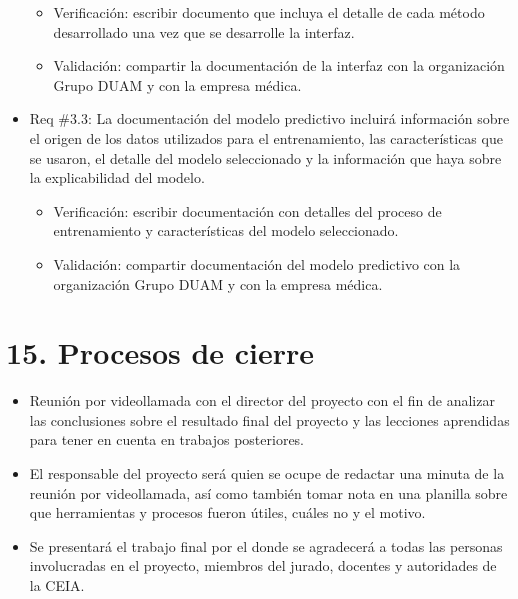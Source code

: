 \documentclass[
11pt, %
]{charter}
\begin{document}
\begin{itemize}
\begin{itemize}
		\item Verificación: escribir documento que incluya el detalle de cada método desarrollado una vez que se desarrolle la interfaz.
		\item Validación: compartir la documentación de la interfaz con la organización Grupo DUAM y con la empresa médica.
	\end{itemize}
	\item Req \#3.3: La documentación del modelo predictivo incluirá información sobre el origen de los datos utilizados para el entrenamiento, las características que se usaron, el detalle del modelo seleccionado y la información que haya sobre la explicabilidad del modelo.
	\begin{itemize}
		\item Verificación: escribir documentación con detalles del proceso de entrenamiento y características del modelo seleccionado.
		\item Validación: compartir documentación del modelo predictivo con la organización Grupo DUAM y con la empresa médica.
	\end{itemize}
\end{itemize}

\section{15. Procesos de cierre}    
\label{sec:cierre}

\begin{itemize}
	\item Reunión por videollamada con el director del proyecto con el fin de analizar las conclusiones sobre el resultado final del proyecto y las lecciones aprendidas para tener en cuenta en trabajos posteriores.
	\item El responsable del proyecto será quien se ocupe de redactar una minuta de la reunión por videollamada, así como también tomar nota en una planilla sobre que herramientas y procesos fueron útiles, cuáles no y el motivo.
	\item Se presentará el trabajo final por el \authorname\hspace{1px} donde se agradecerá a todas las personas involucradas en el proyecto, miembros del jurado, docentes y autoridades de la CEIA.
\end{itemize}
\end{document}

